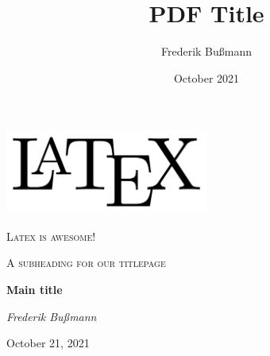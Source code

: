 \documentclass[11pt]{article}
\title{PDF Title}
\author{Frederik Bußmann}
\date{October 2021}
\newcommand\blankpage{
    \null
    \thispagestyle{empty}
    \newpage}
\begin{document}
    \graphicspath{{/data}}

    \begin{titlepage}
        \centering
        \includegraphics[width=0.5\textwidth]{images/latex}\par\vspace{1cm}
        {\scshape\Large Latex is awesome!\par}
        \vspace{1cm}
        {\scshape\Large A subheading for our titlepage\par}
        \vspace{2cm}
        {\Large\textbf{Main title}\par}
        \vspace{2cm}
        {\Large\itshape Frederik Bußmann\par}
        \vfill
        {\large October 21, 2021\par}
    \end{titlepage}
    \clearpage

    \afterpage{\blankpage}
    \clearpage

    \tableofcontents
    \thispagestyle{empty}
    \clearpage

    \setcounter{page}{1}
    

    \printbibliography[heading = bibintoc]
\end{document}

